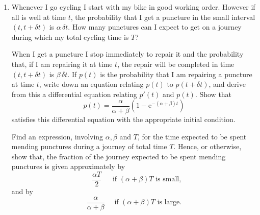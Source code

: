 \documentclass[a4, 11pt]{report}
\newlength{\qspace}
\newcounter{qnumber}
\newenvironment{question}%
 {\vspace{\qspace}
  \begin{enumerate}[\bfseries 1\quad][10]%
    \setcounter{enumi}{\value{qnumber}}%
    \item%
 }
{
  \end{enumerate}
  \filbreak
  \stepcounter{qnumber}
 }
\begin{document}
\begin{question}
Whenever I go cycling I start with my bike in good working order.
However if all is well at time $t$, the probability that I get a
puncture in the small interval $(t,t+\delta t)$ is $\alpha\,\delta t.$
How many punctures can I expect to get on a journey during which my
total cycling time is $T$? 


When I get a puncture I stop immediately to repair it and the probability
that, if I am repairing it at time $t$, the repair will be completed
in time $(t,t+\delta t)$ is $\beta\,\delta t.$ If $p(t)$ is the
probability that I am repairing a puncture at time $t$, write down
an equation relating $p(t)$ to $p(t+\delta t)$, and derive from
this a differential equation relating $p'(t)$ and $p(t).$ Show that
\[
p(t)=\frac{\alpha}{\alpha+\beta}(1-\mathrm{e}^{-(\alpha+\beta)t})
\]
satisfies this differential equation with the appropriate initial
condition. 


Find an expression, involving $\alpha,\beta$ and $T$, for the time
expected to be spent mending punctures during a journey of total time
$T$. Hence, or otherwise, show that, the fraction of the journey
expected to be spent mending punctures is given approximately by 
\[
\quad\frac{\alpha T}{2}\quad\ \mbox{ if }(\alpha+\beta)T\text{ is small, }
\]
and by 
\[
\frac{\alpha}{\alpha+\beta}\quad\mbox{ if }(\alpha+\beta)T\text{ is large.}
\]

\end{question}
	
\end{document}

